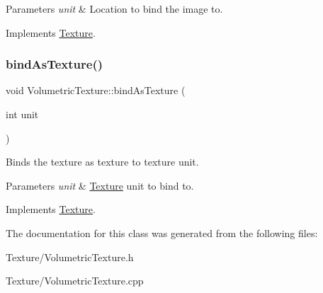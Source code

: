 \begin{DoxyParams}{Parameters}
{\em unit} & Location to bind the image to. \\
\hline
\end{DoxyParams}


Implements \mbox{\hyperlink{class_texture}{Texture}}.

\mbox{\label{class_volumetric_texture_ab151b11d41cb83bcb4fbbe5bbd319ec3}} 
\subsubsection{\texorpdfstring{bindAsTexture()}{bindAsTexture()}}
{\footnotesize\ttfamily void Volumetric\+Texture\+::bind\+As\+Texture (\begin{DoxyParamCaption}\item[{int}]{unit }\end{DoxyParamCaption})\hspace{0.3cm}{\ttfamily [virtual]}}

Binds the texture as texture to texture unit.


\begin{DoxyParams}{Parameters}
{\em unit} & \mbox{\hyperlink{class_texture}{Texture}} unit to bind to. \\
\hline
\end{DoxyParams}


Implements \mbox{\hyperlink{class_texture}{Texture}}.



The documentation for this class was generated from the following files\+:\begin{DoxyCompactItemize}
\item 
Texture/Volumetric\+Texture.\+h\item 
Texture/Volumetric\+Texture.\+cpp\end{DoxyCompactItemize}
